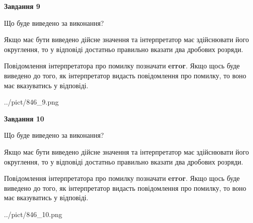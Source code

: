 \documentclass[12pt, ukrainian]{article}
\begin{document}
{\begin {Large}
{\begin {center}\textbf{Завдання 9}\end {center}}\par
Що буде виведено за виконання? \par

Якщо має бути виведено дійсне значення та інтерпретатор має здійснювати його округлення, 
то у відповіді достатньо правильно вказати два дробових розряди.

Повідомлення інтерпретатора про помилку позначати \textbf{error}.
Якщо щось буде виведено до того, як інтерпретатор видасть повідомлення про помилку, 
то воно має вказуватись у відповіді. \par

\begin{center}
	{../pict/846_9.png}
\end{center}
\newpage

{\begin {center}\textbf{Завдання 10}\end {center}}\par
Що буде виведено за виконання? \par

Якщо має бути виведено дійсне значення та інтерпретатор має здійснювати його округлення, 
то у відповіді достатньо правильно вказати два дробових розряди.

Повідомлення інтерпретатора про помилку позначати \textbf{error}.
Якщо щось буде виведено до того, як інтерпретатор видасть повідомлення про помилку, 
то воно має вказуватись у відповіді. \par

\begin{center}
	{../pict/846_10.png}
\end{center}
\newpage

\end {Large}}
\end{document}
